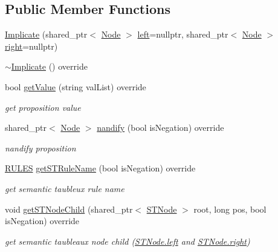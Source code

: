 \subsection*{Public Member Functions}
\begin{DoxyCompactItemize}
\item 
\hyperlink{class_implicate_a7386039d72650d3da8562144b1868722}{Implicate} (shared\+\_\+ptr$<$ \hyperlink{class_node}{Node} $>$ \hyperlink{class_node_a978574f2c08939cfef1041041eb9c5be}{left}=nullptr, shared\+\_\+ptr$<$ \hyperlink{class_node}{Node} $>$ \hyperlink{class_node_af68a851484bce64ed9463a50025df424}{right}=nullptr)
\item 
\hyperlink{class_implicate_a8339c7a4895d95f6c06d7db5714ab8b3}{$\sim$\+Implicate} () override
\item 
bool \hyperlink{class_implicate_a331e1a1fcbe378ef15a3a7f04b7034d5}{get\+Value} (string val\+List) override
\begin{DoxyCompactList}\small\item\em get proposition value \end{DoxyCompactList}\item 
shared\+\_\+ptr$<$ \hyperlink{class_node}{Node} $>$ \hyperlink{class_implicate_a9f3b5d35f552a62ca4a98b4f608a2968}{nandify} (bool is\+Negation) override
\begin{DoxyCompactList}\small\item\em nandify proposition \end{DoxyCompactList}\item 
\hyperlink{proposition_2tableaux_2enum_8h_a70c93904c6a27d228050f922eb4fc3b8}{R\+U\+L\+ES} \hyperlink{class_implicate_aa425e8cb25aec8dd2935346f61ebaefa}{get\+S\+T\+Rule\+Name} (bool is\+Negation) override
\begin{DoxyCompactList}\small\item\em get semantic taubleux rule name \end{DoxyCompactList}\item 
void \hyperlink{class_implicate_aca5eae3d47c318ba413787c7c3a674ce}{get\+S\+T\+Node\+Child} (shared\+\_\+ptr$<$ \hyperlink{class_s_t_node}{S\+T\+Node} $>$ root, long pos, bool is\+Negation) override
\begin{DoxyCompactList}\small\item\em get semantic taubleaux node child (\hyperlink{class_s_t_node_a19ba8bab4660bdeee0e897687b451a8b}{S\+T\+Node.\+left} and \hyperlink{class_s_t_node_a66d06118063fb739058f91c75b725e27}{S\+T\+Node.\+right}) \end{DoxyCompactList}\item 

\end{DoxyCompactItemize}
